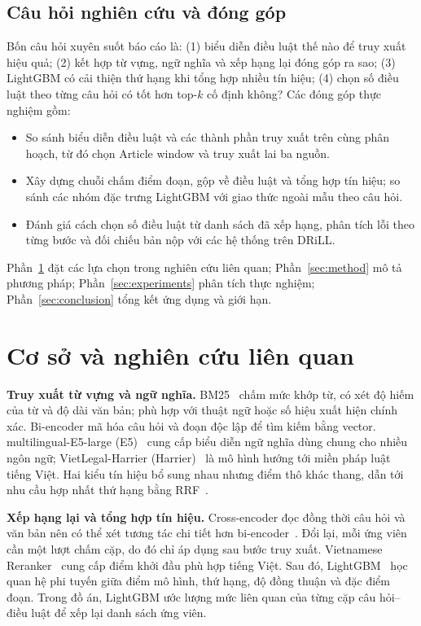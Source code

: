 \documentclass[12pt,a4paper]{article}
\begin{document}
\subsection{Câu hỏi nghiên cứu và đóng góp}
Bốn câu hỏi xuyên suốt báo cáo là: (1) biểu diễn điều luật thế nào để truy xuất hiệu quả; (2) kết hợp từ vựng, ngữ nghĩa và xếp hạng lại đóng góp ra sao; (3) LightGBM có cải thiện thứ hạng khi tổng hợp nhiều tín hiệu; (4) chọn số điều luật theo từng câu hỏi có tốt hơn top-$k$ cố định không? Các đóng góp thực nghiệm gồm:
\begin{itemize}
\item So sánh biểu diễn điều luật và các thành phần truy xuất trên cùng phân hoạch, từ đó chọn Article window và truy xuất lai ba nguồn.
\item Xây dựng chuỗi chấm điểm đoạn, gộp về điều luật và tổng hợp tín hiệu; so sánh các nhóm đặc trưng LightGBM với giao thức ngoài mẫu theo câu hỏi.
\item Đánh giá cách chọn số điều luật từ danh sách đã xếp hạng, phân tích lỗi theo từng bước và đối chiếu bản nộp với các hệ thống trên DRiLL.
\end{itemize}
Phần~\ref{sec:related} đặt các lựa chọn trong nghiên cứu liên quan; Phần~\ref{sec:method} mô tả phương pháp; Phần~\ref{sec:experiments} phân tích thực nghiệm; Phần~\ref{sec:conclusion} tổng kết ứng dụng và giới hạn.
\clearpage
\section{Cơ sở và nghiên cứu liên quan}\label{sec:related}
\textbf{Truy xuất từ vựng và ngữ nghĩa.} BM25~\cite{bm25} chấm mức khớp từ, có xét độ hiếm của từ và độ dài văn bản; phù hợp với thuật ngữ hoặc số hiệu xuất hiện chính xác. Bi-encoder mã hóa câu hỏi và đoạn độc lập để tìm kiếm bằng vector. multilingual-E5-large (E5)~\cite{e5} cung cấp biểu diễn ngữ nghĩa dùng chung cho nhiều ngôn ngữ; VietLegal-Harrier (Harrier)~\cite{harrier} là mô hình hướng tới miền pháp luật tiếng Việt. Hai kiểu tín hiệu bổ sung nhau nhưng điểm thô khác thang, dẫn tới nhu cầu hợp nhất thứ hạng bằng RRF~\cite{rrf}.

\textbf{Xếp hạng lại và tổng hợp tín hiệu.} Cross-encoder đọc đồng thời câu hỏi và văn bản nên có thể xét tương tác chi tiết hơn bi-encoder~\cite{rerankbert}. Đổi lại, mỗi ứng viên cần một lượt chấm cặp, do đó chỉ áp dụng sau bước truy xuất. Vietnamese Reranker~\cite{vnreranker} cung cấp điểm khởi đầu phù hợp tiếng Việt. Sau đó, LightGBM~\cite{lightgbm} học quan hệ phi tuyến giữa điểm mô hình, thứ hạng, độ đồng thuận và đặc điểm đoạn. Trong đồ án, LightGBM ước lượng mức liên quan của từng cặp câu hỏi--điều luật để xếp lại danh sách ứng viên.
\end{document}
